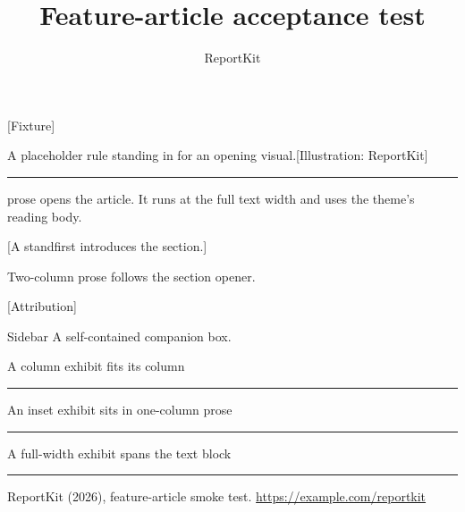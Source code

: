 \documentclass[theme=editorial,publication-type=feature-article]{reportkit}
\title{Feature-article acceptance test}
\author{ReportKit}
\date{}
\begin{document}
\begin{featureopening}
[Fixture]
\begin{openingvisual}{A placeholder rule standing in for an opening visual.}[Illustration: ReportKit]
\rule{\linewidth}{25mm}
\end{openingvisual}
\end{featureopening}

 prose opens the article. It runs at the full text width and uses the theme's reading body.

[A standfirst introduces the section.]

\begin{featurecolumns}
Two-column prose follows the section opener.

[Attribution]

\begin{featuresidebar}{Sidebar}
A self-contained companion box.
\end{featuresidebar}

\begin{featureexhibit}{A column exhibit fits its column}
\rule{\linewidth}{20mm}
\end{featureexhibit}
\end{featurecolumns}

\begin{featureexhibit}{An inset exhibit sits in one-column prose}
\rule{\linewidth}{20mm}
\end{featureexhibit}

\begin{featureexhibit}[span=full]{A full-width exhibit spans the text block}
\rule{\linewidth}{20mm}
\end{featureexhibit}

\begin{featurereferences}
\item ReportKit (2026), feature-article smoke test. \url{https://example.com/reportkit}
\end{featurereferences}
\end{document}
